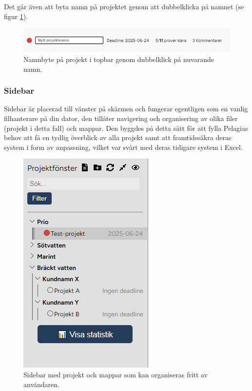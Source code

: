 \noindent Det går även att byta namn på projektet genom att dubbelklicka på namnet (se figur \ref{fig:topbar_nytt_namn}). 

\begin{figure}[H]
    \centering
    \includegraphics[width=0.8\linewidth]{images/topbar_nytt_namn.PNG}
    \caption{Namnbyte på projekt i topbar genom dubbelklick på nuvarande namn.}
    \label{fig:topbar_nytt_namn}
\end{figure}

\subsubsection{Sidebar}
Sidebar är placerad till vänster på skärmen och fungerar egentligen som en vanlig filhanterare på din dator, den tillåter navigering och organisering av olika filer (projekt i detta fall) och mappar.
Den byggdes på detta sätt för att fylla Pelagias behov att få en tydlig överblick av alla projekt samt att framtidssäkra deras system i form av anpassning,
vilket var svårt med deras tidigare system i Excel.  

\begin{figure}[H]
    \centering
    \includegraphics[width=0.5\linewidth]{images/sidebar2.png}
    \caption{Sidebar med projekt och mappar som kan organiseras fritt av användaren.}
    \label{fig:sidebar}
\end{figure}

